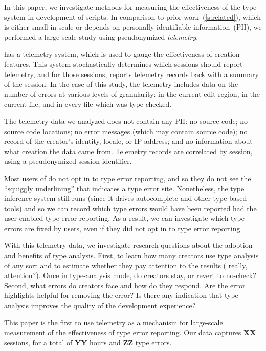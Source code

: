 \documentclass[
  acmsmall,
  review,
  anonymous,
]{acmart}
\begin{document}
In this paper, we investigate methods for measuring the effectiveness
of the  type system in development of  scripts.
In comparison to prior work~(\cref{s:related}), which is either small in scale
or depends on personally identifiable information~(PII),
we performed a large-scale study using pseudonymized \emph{telemetry}.

 has a telemetry system, which is used to gauge
the effectiveness of creation features. This system stochastically
determines which sessions should report telemetry, and for those
sessions, reports telemetry records back with a summary of the
session. In the case of this study, the telemetry includes data on the
number of errors at various levels of granularity: in the current edit
region, in the current file, and in every file which was type
checked.

The telemetry data we analyzed does not contain any PII:
no source code;
no source code locations;
no error messages (which may contain source code);
no record of the creator's identity, locale, or IP address;
and no information about what creation the data came from.
Telemetry records are correlated by session, using a pseudonymized
session identifier.

Most users of  do not opt in to type error
reporting, and so they do not see the ``squiggly underlining'' that
indicates a type error site. Nonetheless, the type inference system
still runs (since it drives autocomplete and other type-based tools) and
so we can record which type errors would have been reported had the
user enabled type error reporting. As a result, we can investigate
which type errors are  fixed by users, even if they did not opt in to
type error reporting.

With this telemetry data, we investigate research questions about
the adoption and benefits of type analysis.
First, to learn how many creators use type analysis of any sort
and to estimate whether they pay attention to the results (\FILL{} really, attention?).
Once in type-analysis mode, do creators stay, or revert to no-check?
Second, what errors do creators face and how do they respond.
Are the error highlights helpful for removing the error?
Is there any indication that type analysis improves the quality of the development experience?

This paper is the first to use telemetry as a mechanism for
large-scale measurement of the effectiveness of type error reporting.
Our data captures \textbf{XX} sessions, for a total of \textbf{YY}
hours and \textbf{ZZ} type errors.
\end{document}
